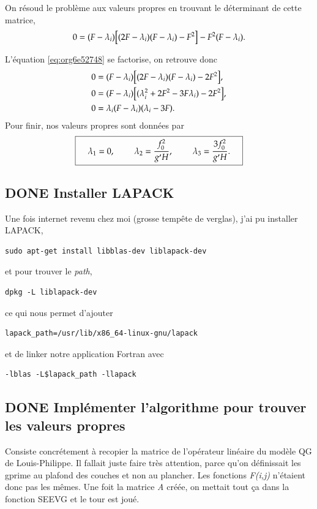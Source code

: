 \documentclass[10pt]{article}
\numberwithin{equation}{section}
\begin{document}
On résoud le problème aux valeurs propres en trouvant le déterminant de cette matrice,
\begin{equation}
\label{eq:org6e52748}
0 = (F-\lambda_i)\qty[(2F - \lambda_i)(F-\lambda_i) - F^2] - F^2(F-\lambda_i).
\end{equation}

L'équation \ref{eq:org6e52748} se factorise, on retrouve donc
\begin{align}
&0 = (F-\lambda_i)\qty[(2F - \lambda_i)(F-\lambda_i) - 2F^2],\nonumber\\
&0 = (F-\lambda_i)\qty[(\lambda^2_i + 2F^2 - 3 F \lambda_i) - 2F^2],\nonumber\\
&0 = \lambda_i \qty(F-\lambda_i)\qty(\lambda_i - 3F).
\end{align}
Pour finir, nos valeurs propres sont données par
\begin{align}
\boxed{\hspace{0.4cm} \lambda_1 = 0,
\hspace{0.8cm} \lambda_2 = \frac{f_0^2}{g' H}, 
\hspace{0.8cm} \lambda_3 = \frac{3 f_0^2}{g'H}. \hspace{0.4cm}}   
\end{align}

\subsection{{\bfseries\sffamily DONE} Installer LAPACK}
\label{sec:orgc5dc3eb}
Une fois internet revenu chez moi (grosse tempête de verglas), j'ai pu installer LAPACK,
\begin{verbatim}
sudo apt-get install libblas-dev liblapack-dev
\end{verbatim}
et pour trouver le \emph{path},
\begin{verbatim}
dpkg -L liblapack-dev
\end{verbatim}
ce qui nous permet d'ajouter
\begin{verbatim}
lapack_path=/usr/lib/x86_64-linux-gnu/lapack
\end{verbatim}
et de linker notre application Fortran avec
\begin{verbatim}
-lblas -L$lapack_path -llapack
\end{verbatim}

\subsection{{\bfseries\sffamily DONE} Implémenter l'algorithme pour trouver les valeurs propres}
\label{sec:org8ae9b7f}
Consiste concrétement à recopier la matrice de l'opérateur linéaire du modèle QG de Louis-Philippe.
Il fallait juste faire très attention, parce qu'on définissait les gprime au plafond des couches et non au plancher.
Les fonctions \emph{F(i,j)} n'étaient donc pas les mêmes.
Une foit la matrice \emph{A} créée, on mettait tout ça dans la fonction SEEVG et le tour est joué.
\end{document}
